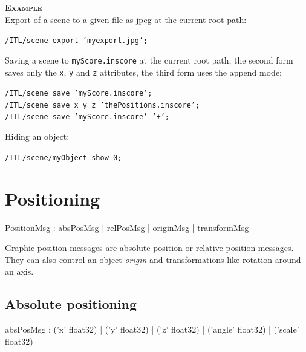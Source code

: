 \documentclass[a4paper,twoside]{report}
\newcommand{\sublevel}[1]	{\section{#1}}
\newcommand{\subsublevel}[1]	{\subsection{#1}}
\newcommand{\OSC}[1]		{\texttt{#1}}
\newcommand{\example}		{\textbf{\hspace{-1.5cm}\textbf{\textsc{Example }}}}
\newcommand{\sample}	[1]			{\vspace{-2mm}\begin{center}\colorbox{mygrey}{
								\begin{minipage}[t]{0.9\columnwidth} 
								{\small \texttt{#1}}
								\end{minipage}}\end{center}}
\begin{document}
\example \\
Export of a scene to a given file as jpeg at the current root path:
\sample{/ITL/scene export 'myexport.jpg';}
Saving a scene to \OSC{myScore.inscore} at the current root path, the second form saves only the \OSC{x}, \OSC{y} and \OSC{z} attributes, the third form uses the append mode:
\sample{/ITL/scene save 'myScore.inscore';\\
/ITL/scene save x y z 'thePositions.inscore'; \\
/ITL/scene save 'myScore.inscore' '+';}
Hiding an object:
\sample{/ITL/scene/myObject show 0;}

\sublevel{Positioning}

\begin{rail}
PositionMsg : 		absPosMsg 
				|	relPosMsg 
				|	originMsg 
				| 	transformMsg
\end{rail}

Graphic position messages are absolute position or relative position messages. They can also control an object \emph{origin} and transformations like rotation around an axis.

\subsublevel{Absolute positioning}

\begin{rail}
absPosMsg :  
			('x' float32)
		| 	('y' float32)
		| 	('z' float32)
		| 	('angle' float32)
		| 	('scale' float32) 
\end{rail}
\end{document}
